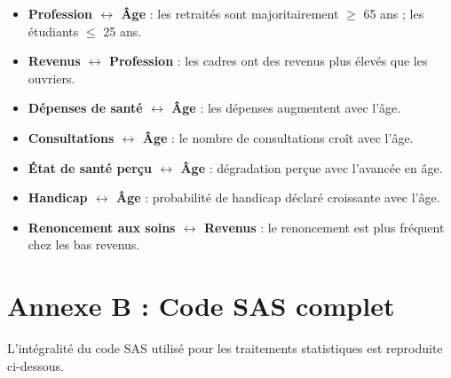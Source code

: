 \documentclass[11pt,a4paper]{memoirerecherche}
\providecommand{\tightlist}{%
  \setlength{\itemsep}{0pt}\setlength{\parskip}{0pt}}
\begin{document}
\begin{itemize}
\tightlist
\item
  \textbf{Profession \(\leftrightarrow\) Âge} : les retraités sont majoritairement \(\geq\) 65 ans ; les étudiants \(\leq\) 25 ans.
\item
  \textbf{Revenus \(\leftrightarrow\) Profession} : les cadres ont des revenus plus élevés que les ouvriers.
\item
  \textbf{Dépenses de santé \(\leftrightarrow\) Âge} : les dépenses augmentent avec l'âge.
\item
  \textbf{Consultations \(\leftrightarrow\) Âge} : le nombre de consultations croît avec l'âge.
\item
  \textbf{État de santé perçu \(\leftrightarrow\) Âge} : dégradation perçue avec l'avancée en âge.
\item
  \textbf{Handicap \(\leftrightarrow\) Âge} : probabilité de handicap déclaré croissante avec l'âge.
\item
  \textbf{Renoncement aux soins \(\leftrightarrow\) Revenus} : le renoncement est plus fréquent chez les bas revenus.
\end{itemize}

\hypertarget{annexe-b-code-sas-complet}{%
\section*{Annexe B : Code SAS complet}\label{annexe-b-code-sas-complet}}

L'intégralité du code SAS utilisé pour les traitements statistiques est reproduite ci-dessous.
\end{document}
